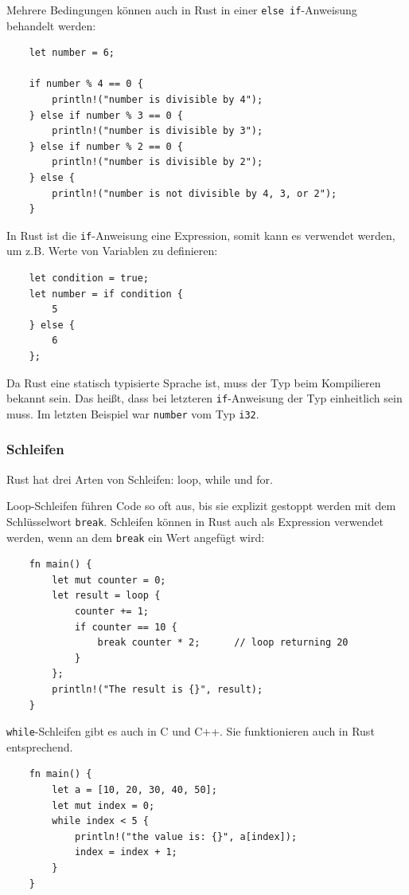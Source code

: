 Mehrere Bedingungen können auch in Rust in einer \verb"else if"-Anweisung behandelt werden:

\begin{lstlisting}
    let number = 6;

    if number % 4 == 0 {
        println!("number is divisible by 4");
    } else if number % 3 == 0 {
        println!("number is divisible by 3");
    } else if number % 2 == 0 {
        println!("number is divisible by 2");
    } else {
        println!("number is not divisible by 4, 3, or 2");
    }
\end{lstlisting}

In Rust ist die \verb"if"-Anweisung eine Expression, somit kann es verwendet werden, um z.B. Werte von Variablen zu definieren:

\begin{lstlisting}
    let condition = true;
    let number = if condition {
        5
    } else {
        6
    };
\end{lstlisting}

Da Rust eine statisch typisierte Sprache ist, muss der Typ beim Kompilieren bekannt sein. Das heißt, dass bei letzteren \verb"if"-Anweisung der Typ einheitlich sein muss. Im letzten Beispiel war \verb"number" vom Typ \verb"i32".

\subsubsection{Schleifen}

Rust hat drei Arten von Schleifen: loop, while und for.

Loop-Schleifen führen Code so oft aus, bis sie explizit gestoppt werden mit dem Schlüsselwort \verb"break". Schleifen können in Rust auch als Expression verwendet werden, wenn an dem \verb"break" ein Wert angefügt wird:

\begin{lstlisting}
    fn main() {
        let mut counter = 0;
        let result = loop {
            counter += 1;
            if counter == 10 {
                break counter * 2;      // loop returning 20
            }
        };
        println!("The result is {}", result);
    }
\end{lstlisting}

\verb"while"-Schleifen gibt es auch in C und C++. Sie funktionieren auch in Rust entsprechend.

\begin{lstlisting}
    fn main() {
        let a = [10, 20, 30, 40, 50];
        let mut index = 0;
        while index < 5 {
            println!("the value is: {}", a[index]);
            index = index + 1;
        }
    }
\end{lstlisting}

